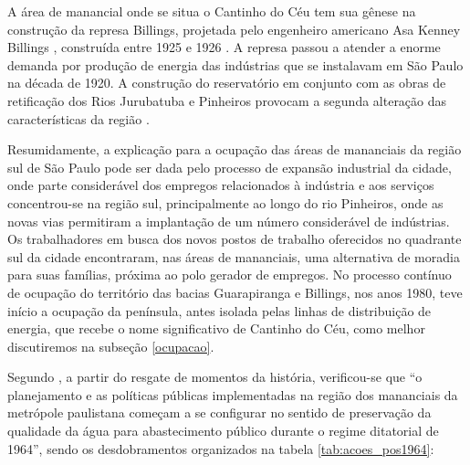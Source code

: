 	A área de manancial onde se situa o Cantinho do Céu tem sua gênese na construção da represa Billings, projetada pelo engenheiro americano Asa Kenney Billings \cite[p.46]{Francca2000}, construída entre 1925 e 1926 \cite[p.53]{Francca2000}. A represa passou a atender a enorme demanda por produção de energia das indústrias que se instalavam em São Paulo na década de 1920. A construção do reservatório em conjunto com as obras de retificação dos Rios Jurubatuba e Pinheiros provocam a segunda alteração das características da região \cite[p.53]{Francca2000}.

	Resumidamente, a explicação para a ocupação das áreas de mananciais da região sul de São Paulo pode ser dada pelo processo de expansão industrial da cidade, onde parte considerável dos empregos relacionados à indústria e aos serviços concentrou-se na região sul, principalmente ao longo do rio Pinheiros, onde as novas vias permitiram a implantação de um número considerável de indústrias. Os trabalhadores em busca dos novos postos de trabalho oferecidos no quadrante sul da cidade encontraram, nas áreas de mananciais, uma alternativa de moradia para suas famílias, próxima ao polo gerador de empregos. No processo contínuo de ocupação do território das bacias Guarapiranga e Billings, nos anos 1980, teve início a ocupação da península, antes isolada pelas linhas de distribuição de energia, que recebe o nome significativo de Cantinho do Céu, como melhor discutiremos na subseção \ref{ocupacao}.
	
	Segundo , a partir do resgate de momentos da história, verificou-se que ``o planejamento e as políticas públicas implementadas na região dos mananciais da metrópole paulistana começam a se configurar no sentido de preservação da qualidade da água para abastecimento público durante o regime ditatorial de 1964'', sendo os desdobramentos organizados na tabela \ref{tab:acoes_pos1964}:
	
